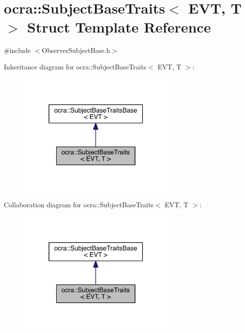 \hypertarget{structocra_1_1SubjectBaseTraits}{}\section{ocra\+:\+:Subject\+Base\+Traits$<$ E\+VT, T $>$ Struct Template Reference}
\label{structocra_1_1SubjectBaseTraits}


{\ttfamily \#include $<$Observer\+Subject\+Base.\+h$>$}



Inheritance diagram for ocra\+:\+:Subject\+Base\+Traits$<$ E\+VT, T $>$\+:\nopagebreak
\begin{figure}[H]
\begin{center}
\leavevmode
\includegraphics[width=225pt]{d3/dc3/structocra_1_1SubjectBaseTraits__inherit__graph}
\end{center}
\end{figure}


Collaboration diagram for ocra\+:\+:Subject\+Base\+Traits$<$ E\+VT, T $>$\+:\nopagebreak
\begin{figure}[H]
\begin{center}
\leavevmode
\includegraphics[width=225pt]{de/d9b/structocra_1_1SubjectBaseTraits__coll__graph}
\end{center}
\end{figure}
